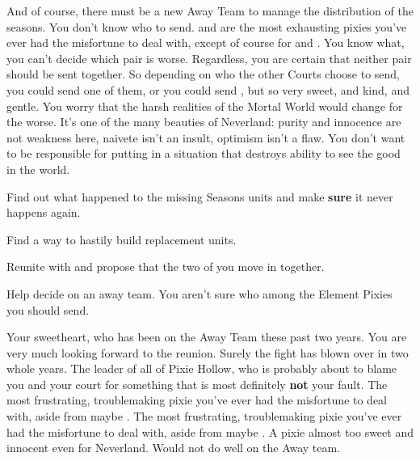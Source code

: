 \documentclass[char]{PP}
\begin{document}
And of course, there must be a new Away Team to manage the distribution of the seasons.  You don't know who to send. \cETitan{} and \cFTitan{} are the most exhausting pixies you've ever had the misfortune to deal with, except of course for \cEAirship{} and \cMAirship{}. You know what, you can't decide which pair is worse. Regardless, you are certain that neither pair should be sent together. So depending on who the other Courts choose to send, you could send one of them, or you could send \cESweet{}, but \cESweet{\theyare} so very sweet, and kind, and gentle. You worry that the harsh realities of the Mortal World would change \cESweet{\them} for the worse. It's one of the many beauties of Neverland: purity and innocence are not weakness here, naivete isn't an insult, optimism isn't a flaw. You don't want to be responsible for putting \cESweet{} in a situation that destroys \cESweet{\their} ability to see the good in the world.


\begin{itemz}
	\item Find out what happened to the missing Seasons units and make \textbf{sure} it never happens again.
	\item Find a way to hastily build replacement units.
	\item Reunite with \cELove{} and propose that the two of you move in together.
	\item Help \cSHead{} decide on an away team. You aren't sure who among the Element Pixies you should send.
\end{itemz}

\begin{contacts}
	\contact{\cELove{}} Your sweetheart, who has been on the Away Team these past two years. You are very much looking forward to the reunion. Surely the fight has blown over in two whole years.
	\contact{\cSHead{}} The leader of all of Pixie Hollow, who is probably about to blame you and your court for something that is most definitely \textbf{not} your fault.
	\contact{\cEAirship{}} The most frustrating, troublemaking pixie you've ever had the misfortune to deal with, aside from maybe \cETitan{}.
	\contact{\cETitan{}} The most frustrating, troublemaking pixie you've ever had the misfortune to deal with, aside from maybe \cEAirship{}.
	\contact{\cESweet{}} A pixie almost too sweet and innocent even for Neverland. Would not do well on the Away team.
\end{contacts}
\end{document}
